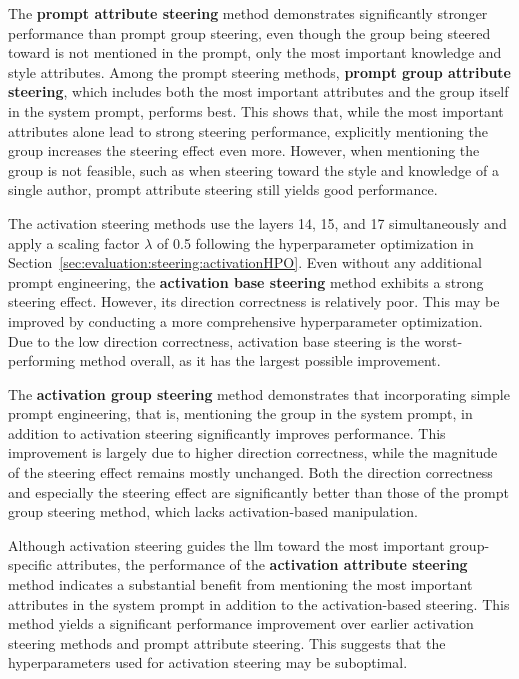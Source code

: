 The \textbf{prompt attribute steering} method demonstrates significantly stronger performance than prompt group steering, even though the group being steered toward is not mentioned in the prompt, only the most important knowledge and style attributes. Among the prompt steering methods, \textbf{prompt group attribute steering}, which includes both the most important attributes and the group itself in the system prompt, performs best. This shows that, while the most important attributes alone lead to strong steering performance, explicitly mentioning the group increases the steering effect even more. However, when mentioning the group is not feasible, such as when steering toward the style and knowledge of a single author, prompt attribute steering still yields good performance.

The activation steering methods use the layers \num{14}, \num{15}, and \num{17} simultaneously and apply a scaling factor \(\lambda\) of \num{0.5} following the hyperparameter optimization in Section~\ref{sec:evaluation:steering:activationHPO}. Even without any additional prompt engineering, the \textbf{activation base steering} method exhibits a strong steering effect. However, its direction correctness is relatively poor. This may be improved by conducting a more comprehensive hyperparameter optimization. Due to the low direction correctness, activation base steering is the worst-performing method overall, as it has the largest possible improvement.

The \textbf{activation group steering} method demonstrates that incorporating simple prompt engineering, that is, mentioning the group in the system prompt, in addition to activation steering significantly improves performance. This improvement is largely due to higher direction correctness, while the magnitude of the steering effect remains mostly unchanged. Both the direction correctness and especially the steering effect are significantly better than those of the prompt group steering method, which lacks activation-based manipulation.

Although activation steering guides the \ac{llm} toward the most important group-specific attributes, the performance of the \textbf{activation attribute steering} method indicates a substantial benefit from mentioning the most important attributes in the system prompt in addition to the activation-based steering. This method yields a significant performance improvement over earlier activation steering methods and prompt attribute steering. This suggests that the hyperparameters used for activation steering may be suboptimal.

